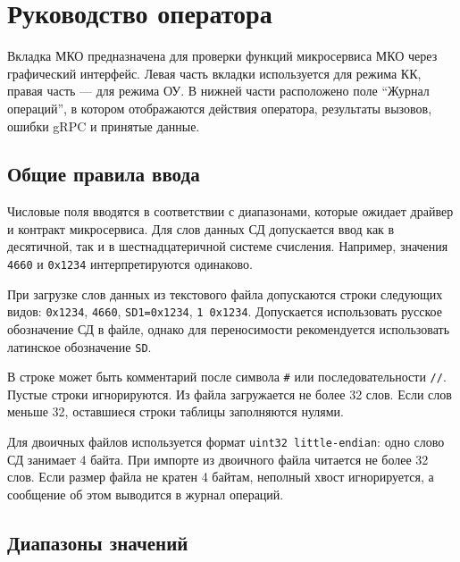 \chapter{Руководство оператора}

Вкладка МКО предназначена для проверки функций микросервиса МКО через графический интерфейс. Левая часть вкладки используется для режима КК, правая часть --- для режима ОУ. В нижней части расположено поле ``Журнал операций'', в котором отображаются действия оператора, результаты вызовов, ошибки gRPC и принятые данные.

\section{Общие правила ввода}

Числовые поля вводятся в соответствии с диапазонами, которые ожидает драйвер и контракт микросервиса. Для слов данных СД допускается ввод как в десятичной, так и в шестнадцатеричной системе счисления. Например, значения \texttt{4660} и \texttt{0x1234} интерпретируются одинаково.

При загрузке слов данных из текстового файла допускаются строки следующих видов: \texttt{0x1234}, \texttt{4660}, \texttt{SD1=0x1234}, \texttt{1 0x1234}. Допускается использовать русское обозначение СД в файле, однако для переносимости рекомендуется использовать латинское обозначение \texttt{SD}.

В строке может быть комментарий после символа \texttt{\#} или последовательности \texttt{//}. Пустые строки игнорируются. Из файла загружается не более 32 слов. Если слов меньше 32, оставшиеся строки таблицы заполняются нулями.

Для двоичных файлов используется формат \texttt{uint32 little-endian}: одно слово СД занимает 4 байта. При импорте из двоичного файла читается не более 32 слов. Если размер файла не кратен 4 байтам, неполный хвост игнорируется, а сообщение об этом выводится в журнал операций.

\section{Диапазоны значений}

